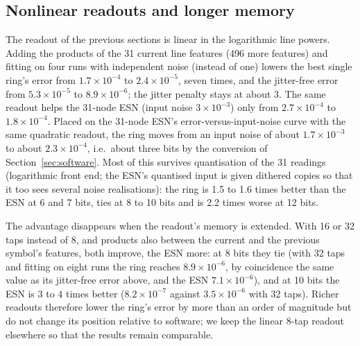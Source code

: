 \subsection{Nonlinear readouts and longer memory}\label{sec:nonlin-readout}

The readout of the previous sections is linear in the logarithmic line powers. Adding the products of the 31 current line features
(496 more features) and fitting on four runs with independent noise (instead of one) lowers the best single ring's error from
$1.7\times10^{-4}$ to $2.4\times10^{-5}$, seven times, and the jitter-free error from $5.3\times10^{-5}$ to $8.9\times10^{-6}$; the jitter
penalty stays at about 3. The same readout helps the 31-node ESN (input noise $3\times10^{-3}$) only from $2.7\times10^{-4}$ to
$1.8\times10^{-4}$. Placed on the 31-node ESN's error-versus-input-noise curve with the same quadratic readout, the ring moves from
an input noise of about $1.7\times10^{-3}$ to about $2.3\times10^{-4}$, i.e.\ about three bits by the conversion of
Section~\ref{sec:software}. Most of this survives quantisation of the 31 readings
(logarithmic front end; the ESN's quantised input is given dithered copies so that it too sees several noise realisations): the ring is
1.5 to 1.6 times better than the ESN at 6 and 7 bits, ties at 8 to 10 bits and is 2.2 times worse at 12 bits.

The advantage disappears when the readout's memory is extended. With 16 or 32 taps instead of 8, and products also between
the current and the previous symbol's features, both improve, the ESN more: at 8 bits they tie (with 32 taps and fitting on eight runs the ring
reaches $8.9\times10^{-6}$, by coincidence the same value as its jitter-free error above, and the ESN $7.1\times10^{-6}$), and at 10 bits the ESN is 3 to 4 times better ($8.2\times10^{-7}$ against $3.5\times10^{-6}$ with 32 taps).
Richer readouts therefore lower the ring's error by more than an order of magnitude but do not change its position relative to
software; we keep the linear 8-tap readout elsewhere so that the results remain comparable.
